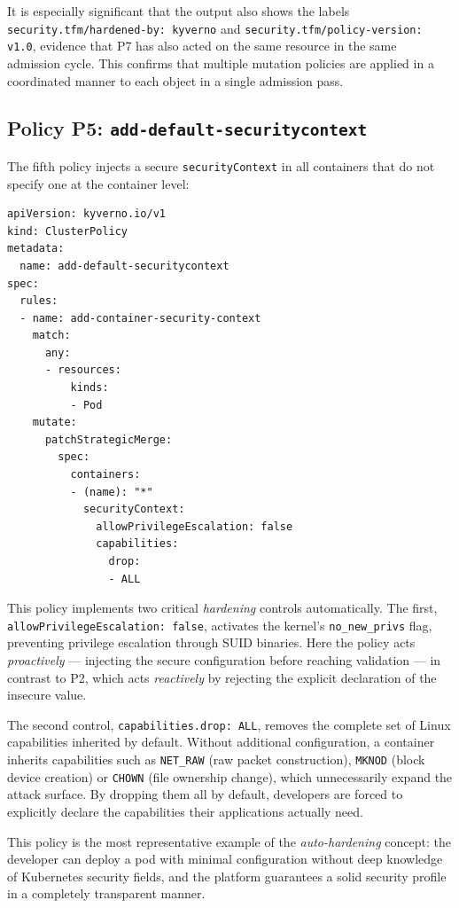 It is especially significant that the output also shows the labels \texttt{security.tfm/\allowbreak{}hardened-by:\,kyverno} and \texttt{security.tfm/\allowbreak{}policy-version:\,v1.0}, evidence that P7 has also acted on the same resource in the same admission cycle. This confirms that multiple mutation policies are applied in a coordinated manner to each object in a single admission pass.

\subsection{Policy P5: \texttt{add-default-securitycontext}}

The fifth policy injects a secure \texttt{securityContext} in all containers that do not specify one at the container level:

\begin{lstlisting}
apiVersion: kyverno.io/v1
kind: ClusterPolicy
metadata:
  name: add-default-securitycontext
spec:
  rules:
  - name: add-container-security-context
    match:
      any:
      - resources:
          kinds:
          - Pod
    mutate:
      patchStrategicMerge:
        spec:
          containers:
          - (name): "*"
            securityContext:
              allowPrivilegeEscalation: false
              capabilities:
                drop:
                - ALL
\end{lstlisting}

This policy implements two critical \textit{hardening} controls automatically. The first, \texttt{allow\-Privilege\-Escalation:\,false}, activates the kernel's \texttt{no\_new\_privs} flag, preventing privilege escalation through SUID binaries. Here the policy acts \textit{proactively} --- injecting the secure configuration before reaching validation --- in contrast to P2, which acts \textit{reactively} by rejecting the explicit declaration of the insecure value.

The second control, \texttt{capabilities.drop:\,ALL}, removes the complete set of Linux capabilities inherited by default. Without additional configuration, a container inherits capabilities such as \texttt{NET\_RAW} (raw packet construction), \texttt{MKNOD} (block device creation) or \texttt{CHOWN} (file ownership change), which unnecessarily expand the attack surface. By dropping them all by default, developers are forced to explicitly declare the capabilities their applications actually need.

This policy is the most representative example of the \textit{auto-hardening} concept: the developer can deploy a pod with minimal configuration without deep knowledge of Kubernetes security fields, and the platform guarantees a solid security profile in a completely transparent manner.

